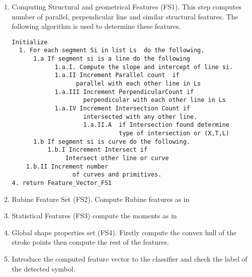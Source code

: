 \begin{enumerate}
	\item Computing Structural and geometrical Features (FS1). This step computes number of parallel, perpendicular line and similar structural features. The following algorithm is used to determine these features.
	 
	\begin{verbatim}
Initialize 
  1. For each segment Si in list Ls  do the following. 
      1.a If segment si is a line do the following 
            1.a.I. Compute the slope and intercept of line si. 
            1.a.II Increment Parallel count  if 
                  parallel with each other line in Ls
            1.a.III Increment PerpendicularCount if 
                    perpendicular with each other line in Ls 
            1.a.IV Increment Intersection Count if 
                    intersected with any other line. 
                    1.a.II.A  if Intersection found determine 
                              type of intersection or (X,T,L)
      1.b If segment si is curve do the following. 
          1.b.I Increment Intersect if
               Intersect other line or curve
    1.b.II Increment number 
                 of curves and primitives. 
4. return Feature_Vector_FS1
\end{verbatim}	

	\item Rubine Feature Set (FS2).  Compute Rubine features as in \cite{gestureexample12} 
	\item Statistical Features (FS3) compute the moments as in \cite{zernike61}
	\item Global shape properties set (FS4). Firstly compute the convex hull of the stroke points then compute the rest of the features. 
	
	\item Introduce the computed feature vector to the classifier and check the label of the detected symbol. 
\end{enumerate}


